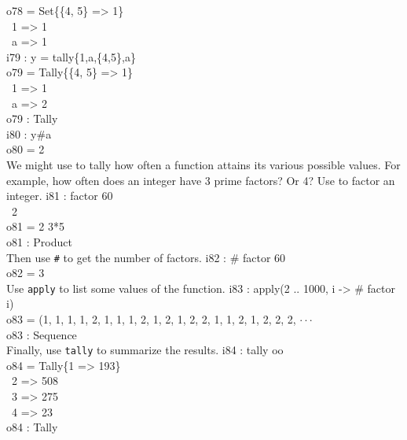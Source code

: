 \emptyLine
o78 = Set\{\{4, 5\} => 1\}\\
\          1 => 1\\
\          a => 1\\
\endOutput
\beginOutput
i79 : y = tally\{1,a,\{4,5\},a\}\\
\emptyLine
o79 = Tally\{\{4, 5\} => 1\}\\
\            1 => 1\\
\            a => 2\\
\emptyLine
o79 : Tally\\
\endOutput
\beginOutput
i80 : y#a\\
\emptyLine
o80 = 2\\
\endOutput
We might use  to tally how often a function attains its various
possible values.  For example, how often does an integer have 3 prime
factors?  Or 4?  Use  to factor an integer.
\beginOutput
i81 : factor 60\\
\emptyLine
\       2\\
o81 = 2 3*5\\
\emptyLine
o81 : Product\\
\endOutput
Then use {\tt \#} to get the number of factors.
\beginOutput
i82 : # factor 60\\
\emptyLine
o82 = 3\\
\endOutput
Use {\tt apply} to list some values of the function.
\beginOutput
i83 : apply(2 .. 1000, i -> # factor i)\\
\emptyLine
o83 = (1, 1, 1, 1, 2, 1, 1, 1, 2, 1, 2, 1, 2, 2, 1, 1, 2, 1, 2, 2, 2,  $\cdot\cdot\cdot$\\
\emptyLine
o83 : Sequence\\
\endOutput
Finally, use {\tt tally} to summarize the results.
\beginOutput
i84 : tally oo\\
\emptyLine
o84 = Tally\{1 => 193\}\\
\            2 => 508\\
\            3 => 275\\
\            4 => 23\\
\emptyLine
o84 : Tally\\
\endOutput

